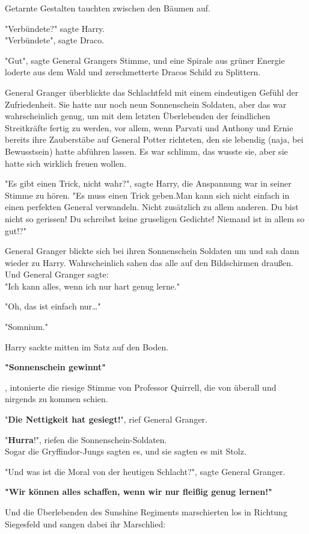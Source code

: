 {Getarnte Gestalten tauchten zwischen den Bäumen auf.

"Verbündete?" sagte Harry.\\ "Verbündete", sagte Draco.

"Gut", sagte General Grangers Stimme, und eine Spirale aus grüner Energie loderte aus dem Wald und zerschmetterte Dracos Schild zu Splittern.

General Granger überblickte das Schlachtfeld mit einem eindeutigen Gefühl der Zufriedenheit. Sie hatte nur noch neun Sonnenschein Soldaten, aber das war wahrscheinlich genug, um mit dem letzten Überlebenden der feindlichen Streitkräfte fertig zu werden, vor allem, wenn Parvati und Anthony und Ernie bereits ihre Zauberstäbe auf General Potter richteten, den sie lebendig (naja, bei Bewusstsein) hatte abführen lassen. Es war schlimm, das wusste sie, aber sie hatte sich wirklich freuen wollen.

"Es gibt einen Trick, nicht wahr?", sagte Harry, die Anspannung war in seiner Stimme zu hören. "Es muss einen Trick geben.Man kann sich nicht einfach in einen perfekten General verwandeln. Nicht zusätzlich zu allem anderen. Du bist nicht so gerissen! Du schreibst keine gruseligen Gedichte! Niemand ist in allem so gut!?"

General Granger blickte sich bei ihren Sonnenschein Soldaten um und sah dann wieder zu Harry. Wahrscheinlich sahen das alle auf den Bildschirmen draußen. Und General Granger sagte:\\ "Ich kann alles, wenn ich nur hart genug lerne."

"Oh, das ist einfach nur…"

"Somnium."

Harry sackte mitten im Satz auf den Boden.

\textbf{"Sonnenschein gewinnt"}

, intonierte die riesige Stimme von Professor Quirrell, die von überall und nirgends zu kommen schien.

"\textbf{Die Nettigkeit hat gesiegt!}", rief General Granger.

"\textbf{Hurra}!", riefen die Sonnenschein-Soldaten.\\ Sogar die Gryffindor-Jungs sagten es, und sie sagten es mit Stolz.

"Und was ist die Moral von der heutigen Schlacht?", sagte General Granger.

\textbf{"Wir können alles schaffen, wenn wir nur fleißig genug lernen!"}

Und die Überlebenden des Sunshine Regiments marschierten los in Richtung Siegesfeld und sangen dabei ihr Marschlied:

}
